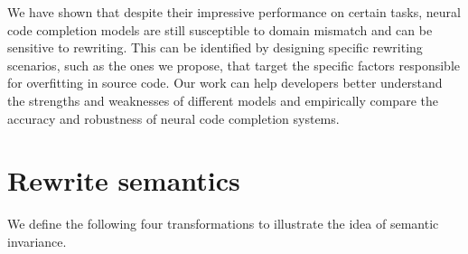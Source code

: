 \documentclass[usenames,dvipsnames]{article} %
\begin{document}
  We have shown that despite their impressive performance on certain tasks, neural code completion models are still susceptible to domain mismatch and can be sensitive to rewriting. This can be identified by designing specific rewriting scenarios, such as the ones we propose, that target the specific factors responsible for overfitting in source code. Our work can help developers better understand the strengths and weaknesses of different models and empirically compare the accuracy and robustness of neural code completion systems.


  
  
  \pagebreak
  \appendix
  \section{Rewrite semantics}\label{sec:rewrite_semantics}

  We define the following four transformations to illustrate the idea of semantic invariance.

  \begin{center}
    \begin{prooftree}
    \end{prooftree}

    \begin{prooftree}
    \end{prooftree}

    \begin{prooftree}
    \end{prooftree}

    \begin{prooftree}
    \end{prooftree}
  \end{center}
\end{document}
